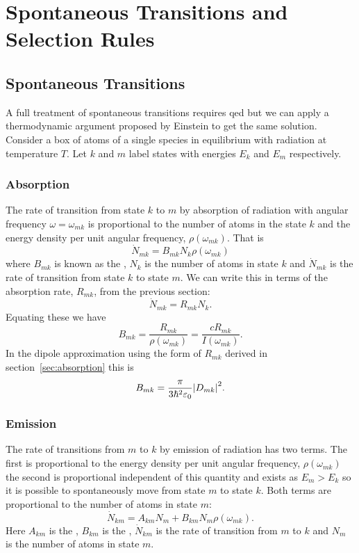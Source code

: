 \documentclass[a4paper]{article}
\begin{document}
    \section{Spontaneous Transitions and Selection Rules}
    \subsection{Spontaneous Transitions}
    A full treatment of spontaneous transitions requires \gls{qed} but we can apply a thermodynamic argument proposed by Einstein to get the same solution.
    Consider a box of atoms of a single species in equilibrium with radiation at temperature \(T\).
    Let \(k\) and \(m\) label states with energies \(E_k\) and \(E_m\) respectively.
    
    \subsubsection{Absorption}
    The rate of transition from state \(k\) to \(m\) by absorption of radiation with angular frequency \(\omega = \omega_{mk}\) is proportional to the number of atoms in the state \(k\) and the energy density per unit angular frequency, \(\rho(\omega_{mk})\).
    That is
    \[\dot{N}_{mk} = B_{mk}N_k\rho(\omega_{mk})\]
    where \(B_{mk}\) is known as the , \(N_k\) is the number of atoms in state \(k\) and \(\dot{N}_{mk}\) is the rate of transition from state \(k\) to state \(m\).
    We can write this in terms of the absorption rate, \(R_{mk}\), from the previous section:
    \[\dot{N}_{mk} = R_{mk}N_k.\]
    Equating these we have
    \[B_{mk} = \frac{R_{mk}}{\rho(\omega_{mk})} = \frac{cR_{mk}}{I(\omega_{mk})}.\]
    In the dipole approximation using the form of \(R_{mk}\) derived in section~\ref{sec:absorption} this is
    \[B_{mk} = \frac{\pi}{3\hbar^2\varepsilon_0}\abs{D_{mk}}^2.\]
    
    \subsubsection{Emission}
    The rate of transitions from \(m\) to \(k\) by emission of radiation has two terms.
    The first is proportional to the energy density per unit angular frequency, \(\rho(\omega_{mk})\) the second is proportional independent of this quantity and exists as \(E_m > E_k\) so it is possible to spontaneously move from state \(m\) to state \(k\).
    Both terms are proportional to the number of atoms in state \(m\):
    \[\dot{N}_{km} = A_{km}N_m + B_{km}N_m\rho(\omega_{mk}).\]
    Here \(A_{km}\) is the , \(B_{km}\) is the , \(\dot{N}_{km}\) is the rate of transition from \(m\) to \(k\) and \(N_m\) is the number of atoms in state \(m\).
    
\end{document}

